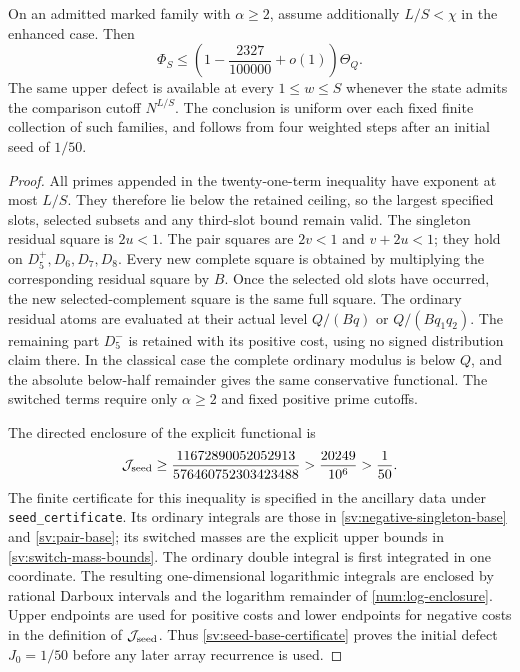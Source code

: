 \begin{lemma}\label{sv:finite-seed}
On an admitted marked family with $\alpha\ge2$, assume additionally
$L/S<\chi$ in the enhanced case. Then
\[
 \Phi_S\le\left(1-\frac{2327}{100000}+o(1)\right)\Theta_Q.
\]
The same upper defect is available at every $1\le w\le S$ whenever
the state admits the comparison cutoff $N^{L/S}$. The conclusion is
uniform over each fixed finite collection of such families, and follows
from four weighted steps after an initial seed of $1/50$.
\end{lemma}

\begin{proof}
All primes appended in the twenty-one-term inequality have exponent
at most $L/S$. They therefore lie below the retained ceiling, so the
largest specified slots, selected subsets and any third-slot bound
remain valid. The singleton residual square is $2u<1$. The pair squares
are $2v<1$ and $v+2u<1$; they hold on $D_5^+,D_6,D_7,D_8$.
Every new complete square is obtained by multiplying the corresponding
residual square by $B$. Once the selected old slots have occurred,
the new selected-complement square is the same full square. The
ordinary residual atoms are evaluated at their actual level
$Q/(Bq)$ or $Q/(Bq_1q_2)$. The remaining part $D_5^-$ is retained
with its positive cost, using no signed distribution claim there.
In the classical case the complete ordinary modulus is below $Q$,
and the absolute below-half remainder gives the same conservative
functional. The switched terms require only $\alpha\ge2$ and fixed
positive prime cutoffs.

The directed enclosure of the explicit functional is
\begin{equation}\label{sv:seed-base-certificate}
 \mathcal J_{\rm seed}\ge
 \frac{11672890052052913}{576460752303423488}
 >\frac{20249}{10^6}>\frac1{50}.
\end{equation}
The finite certificate for this inequality is specified in the
ancillary data under \texttt{seed\_certificate}. Its ordinary
integrals are those in \eqref{sv:negative-singleton-base} and
\eqref{sv:pair-base}; its switched masses are the explicit upper
bounds in \eqref{sv:switch-mass-bounds}. The ordinary double integral
is first integrated in one coordinate. The resulting one-dimensional
logarithmic integrals are enclosed by rational Darboux intervals and
the logarithm remainder of \eqref{num:log-enclosure}. Upper endpoints
are used for positive costs and lower endpoints for negative costs in
the definition of $\mathcal J_{\rm seed}$. Thus
\eqref{sv:seed-base-certificate} proves the initial defect $J_0=1/50$
before any later array recurrence is used.


\end{proof}
